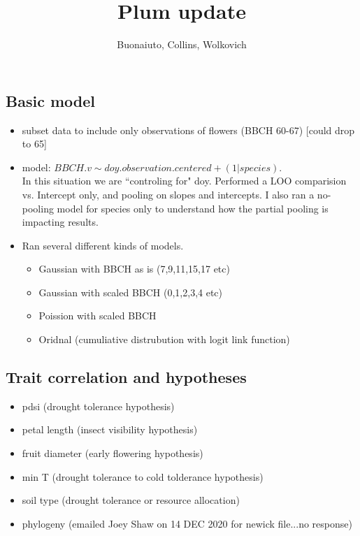 \documentclass[12pt]{article}\usepackage[]{graphicx}\usepackage[]{color}
\title{Plum update}
\author{Buonaiuto, Collins, Wolkovich}
\begin{document}
\maketitle
\subsection{Basic model}
\begin{itemize}
\item subset data to include only observations of flowers (BBCH 60-67) [could drop to 65]
\item model: $BBCH.v \sim doy.observation.centered + (1|species)$.\\
In this situation we are ``controling for" doy. Performed a LOO comparision vs. Intercept only, and pooling on slopes and intercepts. I also ran a no-pooling model for species only to understand how the partial pooling is impacting results.
\item Ran several different kinds of models. 
\begin{itemize}
\item Gaussian with BBCH as is (7,9,11,15,17 etc)
\item Gaussian with scaled BBCH (0,1,2,3,4 etc)
\item Poission with scaled BBCH
\item Oridnal (cumuliative distrubution with logit link function)
\end{itemize}
\end{itemize}
    
\subsection{Trait correlation and hypotheses}
\begin{itemize}
\item pdsi (drought tolerance hypothesis)
\item petal length (insect visibility hypothesis)
\item fruit diameter (early flowering hypothesis)
\item min T (drought tolerance to cold tolderance hypothesis)
\item soil type (drought tolerance or resource allocation)
\item phylogeny (emailed Joey Shaw on 14 DEC 2020 for newick file...no response)
\end{itemize}
\end{document}
